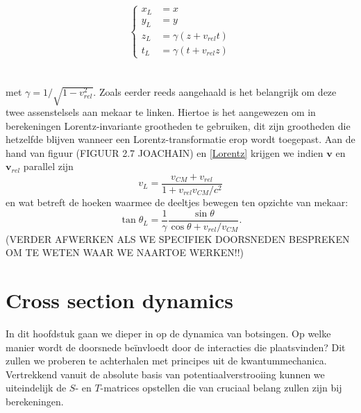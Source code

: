 \documentclass[11pt]{article}
\numberwithin{equation}{section}
\begin{document}
\begin{equation}\label{Lorentz}
\left\{ \begin{aligned}
	x_L &= x\\
	y_L &= y\\
	z_L &= \gamma ( z + v_{rel}t)\\
	t_L &= \gamma ( t + v_{rel}z)
\end{aligned}
\right.
\end{equation}
\\ \\
met $\gamma = 1/ \sqrt{1-v_{rel}^2}$.
Zoals eerder reeds aangehaald is het belangrijk om deze twee assenstelsels aan mekaar te linken. Hiertoe is het aangewezen om in berekeningen Lorentz-invariante grootheden te gebruiken, dit zijn grootheden die hetzelfde blijven wanneer een Lorentz-transformatie erop wordt toegepast. Aan de hand van figuur (FIGUUR 2.7 JOACHAIN) en \eqref{Lorentz} krijgen we indien $\textbf{v}$ en $\textbf{v}_{rel}$ parallel zijn
\begin{equation}
v_L = \frac{v_{CM} + v_{rel}}{1 + v_{rel}v_{CM}/c^2}
\end{equation}
en wat betreft de hoeken waarmee de deeltjes bewegen ten opzichte van mekaar:
\begin{equation}
\tan \theta_L = \frac{1}{\gamma} \frac{\sin \theta}{\cos \theta	+ v_{rel}/v_{CM}}.
\end{equation}
(VERDER AFWERKEN ALS WE SPECIFIEK DOORSNEDEN BESPREKEN OM TE WETEN WAAR WE NAARTOE WERKEN!!)




\section{Cross section dynamics}
In dit hoofdstuk gaan we dieper in op de dynamica van botsingen. Op welke manier wordt de doorsnede be\"invloedt door de interacties die plaatsvinden? Dit zullen we proberen te achterhalen met principes uit de kwantummechanica. Vertrekkend vanuit de absolute basis van potentiaalverstrooiing kunnen we uiteindelijk de $S$- en $T$-matrices opstellen die van cruciaal belang zullen zijn bij berekeningen.
\end{document}
